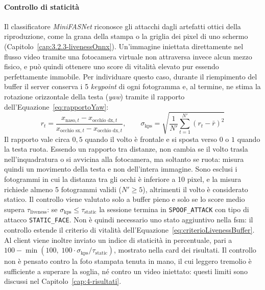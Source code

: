 \paragraph{Controllo di staticità}
Il classificatore \textit{MiniFASNet} riconosce gli attacchi dagli artefatti ottici della riproduzione, come la grana della stampa o la griglia dei pixel di uno schermo (Capitolo~\ref{cap:3.2.3-livenessOnnx}).
Un'immagine iniettata direttamente nel flusso video tramite una fotocamera virtuale non attraversa invece alcun mezzo fisico, e può quindi ottenere uno score di vitalità elevato pur essendo perfettamente immobile.
Per individuare questo caso, durante il riempimento del buffer il server conserva i 5 \textit{keypoint} di ogni fotogramma e, al termine, ne stima la rotazione orizzontale della testa (\textit{yaw}) tramite il rapporto dell'Equazione~\eqref{eq:rapportoYaw}:
\begin{equation}
    \label{eq:rapportoYaw}
    r_t = \frac{x_{\text{naso},t} - x_{\text{occhio dx},t}}{x_{\text{occhio sx},t} - x_{\text{occhio dx},t}}, \qquad
    \sigma_{\text{kps}} = \sqrt{\frac{1}{N'} \sum_{t=1}^{N'} \left(r_t - \bar{r}\right)^2}
\end{equation}
Il rapporto vale circa $0{,}5$ quando il volto è frontale e si sposta verso $0$ o $1$ quando la testa ruota.
Essendo un rapporto tra distanze, non cambia se il volto trasla nell'inquadratura o si avvicina alla fotocamera, ma soltanto se ruota: misura quindi un movimento della testa e non dell'intera immagine.
Sono esclusi i fotogrammi in cui la distanza tra gli occhi è inferiore a 10 pixel, e la misura richiede almeno 5 fotogrammi validi ($N' \ge 5$), altrimenti il volto è considerato statico.
Il controllo viene valutato solo a buffer pieno e solo se lo score medio supera $\tau_{\text{liveness}}$: se $\sigma_{\text{kps}} \le \tau_{\text{static}}$ la sessione termina in \texttt{SPOOF\_ATTACK} con tipo di attacco \texttt{STATIC\_FACE}.
Non è quindi necessario uno stato aggiuntivo nella \gls{fsm}: il controllo estende il criterio di vitalità dell'Equazione~\eqref{eq:criterioLivenessBuffer}.
Al client viene inoltre inviato un indice di staticità in percentuale, pari a $100 - \min\left(100, \; 100 \cdot \sigma_{\text{kps}} / \tau_{\text{static}}\right)$, mostrato nella card dei risultati.
Il controllo non è pensato contro la foto stampata tenuta in mano, il cui leggero tremolio è sufficiente a superare la soglia, né contro un video iniettato: questi limiti sono discussi nel Capitolo~\ref{cap:4-risultati}.

